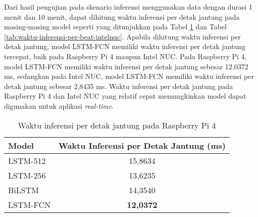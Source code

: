 Dari hasil pengujian pada skenario inferensi menggunakan data dengan durasi 1 menit dan 10 menit, dapat dihitung waktu inferensi per detak jantung pada masing-masing model seperti yang ditunjukkan pada Tabel \ref{tab:waktu-inferensi-per-beat-raspi4} dan Tabel \ref{tab:waktu-inferensi-per-beat-intelnuc}.
Apabila dihitung waktu inferensi per detak jantung, model LSTM-FCN memiliki waktu inferensi per detak jantung tercepat, baik pada Raspberry Pi 4 maupun Intel NUC.
Pada Raspberry Pi 4, model LSTM-FCN memiliki waktu inferensi per detak jantung sebesar 12,0372 ms, sedangkan pada Intel NUC, model LSTM-FCN memiliki waktu inferensi per detak jantung sebesar 2,8435 ms.
Waktu inferensi per detak jantung pada Raspberry Pi 4 dan Intel NUC yang relatif cepat memungkinkan model dapat digunakan untuk aplikasi \textit{real-time}.




\begin{table}[H]
\centering
\caption{Waktu inferensi per detak jantung pada Raspberry Pi 4}
\label{tab:waktu-inferensi-per-beat-raspi4}
\begin{tabularx}{0.8\textwidth}{
  |>{\centering\arraybackslash}X
  |c
|}
\hline
\textbf{Model} & \textbf{Waktu Inferensi per Detak Jantung (ms)} \\ \hline
LSTM-512       & 15,8634                   \\
\hline
LSTM-256       & 13,6235                   \\
\hline
BiLSTM         & 14,3540                   \\
\hline
LSTM-FCN       & \textbf{12,0372}                   \\ \hline
\end{tabularx}
\end{table}

